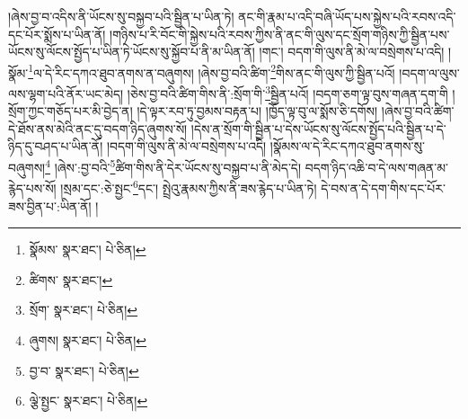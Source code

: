 །ཞེས་བྱ་བ་འདིས་ནི་ཡོངས་སུ་བསྐྱབ་པའི་སྦྱིན་པ་ཡིན་ཏེ། ནང་གི་རྣམ་པ་འདི་བཞི་ཡོད་པས་སྐྱེས་པའི་རབས་འདི་དང་པོར་སྨོས་པ་ཡིན་ནོ། །གཉིས་པ་རི་བོང་གི་སྐྱེས་པའི་རབས་ཀྱིས་ནི་ནང་གི་ལུས་དང་སྲོག་གཉིས་ཀྱི་སྦྱིན་པས་ཡོངས་སུ་ལོངས་སྤྱོད་པ་ཡིན་ཏེ་ཡོངས་སུ་སྐྱོབ་པ་ནི་མ་ཡིན་ནོ། །གང་། བདག་གི་ལུས་ནི་མེ་ལ་བསྲེགས་པ་འདི། །སྣོམ་\footnote{སྣོམས་  སྣར་ཐང་།  པེ་ཅིན། }ལ་དེ་རིང་དཀའ་ཐུབ་ནགས་ན་བཞུགས། །ཞེས་བྱ་བའི་ཚིག་\footnote{ཚིགས་  སྣར་ཐང་། }གིས་ནང་གི་ལུས་ཀྱི་སྦྱིན་པའོ། །བདག་ལ་ལུས་ལས་ལྷག་པའི་ནོར་ཡང་མེད། །ཅེས་བྱ་བའི་ཚིག་གིས་ནི་:སྲོག་གི་\footnote{སྲོག་  སྣར་ཐང་།  པེ་ཅིན། }སྦྱིན་པའོ། །བདག་ཅག་ལྟ་བུས་གཞན་དག་གི །སྲོག་ཀྱང་གཅོད་པར་མི་བྱེད་ན། །དེ་ལྟར་རབ་ཏུ་བྱམས་བརྟན་པ། །ཁྱོད་ལྟ་བུ་ལ་སྨོས་ཅི་དགོས། །ཞེས་བྱ་བའི་ཚིག་དེ་ཐོས་ནས་མེའི་ནང་དུ་བདག་ཉིད་ཞུགས་སོ། །དེས་ན་སྲོག་གི་སྦྱིན་པ་དེས་ཡོངས་སུ་ལོངས་སྤྱོད་པའི་སྦྱིན་པ་དེ་ཉིད་དུ་བཤད་པ་ཡིན་ནོ། །བདག་གི་ལུས་ནི་མེ་ལ་བསྲེགས་པ་འདི། །སྣོམས་ལ་དེ་རིང་དཀའ་ཐུབ་ནགས་སུ་བཞུགས།\footnote{ཞུགས།  སྣར་ཐང་།  པེ་ཅིན། } །ཞེས་:བྱ་བའི་\footnote{བྱ་བ་  སྣར་ཐང་།  པེ་ཅིན། }ཚིག་གིས་ནི་དེར་ཡོངས་སུ་བསྐྱབ་པ་ནི་མེད་དེ། བདག་ཉིད་འཆི་བ་དེ་ལས་གཞན་མ་རྙེད་པས་སོ། །སྲམ་དང་:ཅེ་སྤྱང་\footnote{ལྕེ་སྤྱང་  སྣར་ཐང་།  པེ་ཅིན། }དང་། སྤྲེའུ་རྣམས་ཀྱིས་ནི་ཟས་རྙེད་པ་ཡིན་ཏེ། དེ་བས་ན་དེ་དག་གིས་དང་པོར་ཟས་བྱིན་པ་:ཡིན་ནོ། །

